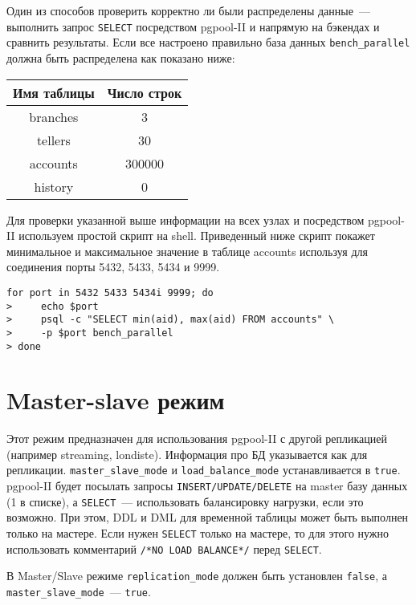Один из способов проверить корректно ли были распределены данные~--- выполнить запрос \lstinline!SELECT! посредством pgpool-II и напрямую на бэкендах и сравнить результаты. Если все настроено правильно база данных \lstinline!bench_parallel! должна быть распределена как показано ниже:

\begin{tabular}{ | c | c | }
  \hline
  Имя таблицы & Число строк \\
  \hline
  branches & 3 \\
  \hline
  tellers & 30 \\
  \hline
  accounts & 300000 \\
  \hline
  history & 0 \\
  \hline
\end{tabular}

Для проверки указанной выше информации на всех узлах и посредством pgpool-II используем простой скрипт на shell. Приведенный ниже скрипт покажет минимальное и максимальное значение в таблице accounts используя для соединения порты 5432, 5433, 5434 и 9999.

\begin{lstlisting}[label=lst:pgpool39,caption=Проверка параллельного запроса]
for port in 5432 5433 5434i 9999; do
>     echo $port
>     psql -c "SELECT min(aid), max(aid) FROM accounts" \
>     -p $port bench_parallel
> done
\end{lstlisting}





\section{Master-slave режим}

Этот режим предназначен для использования pgpool-II с другой репликацией (например streaming, londiste). Информация про БД указывается как для репликации. \lstinline!master_slave_mode! и \lstinline!load_balance_mode! устанавливается в \lstinline!true!. pgpool-II будет посылать запросы \lstinline!INSERT/UPDATE/DELETE! на master базу данных (1 в списке), а \lstinline!SELECT!~--- использовать балансировку нагрузки, если это возможно. При этом, DDL и DML для временной таблицы может быть выполнен только на мастере. Если нужен \lstinline!SELECT! только на мастере, то для этого нужно использовать комментарий \lstinline!/*NO LOAD BALANCE*/! перед \lstinline!SELECT!.

В Master/Slave режиме \lstinline!replication_mode! должен быть установлен \lstinline!false!, а \lstinline!master_slave_mode!~--- \lstinline!true!.


